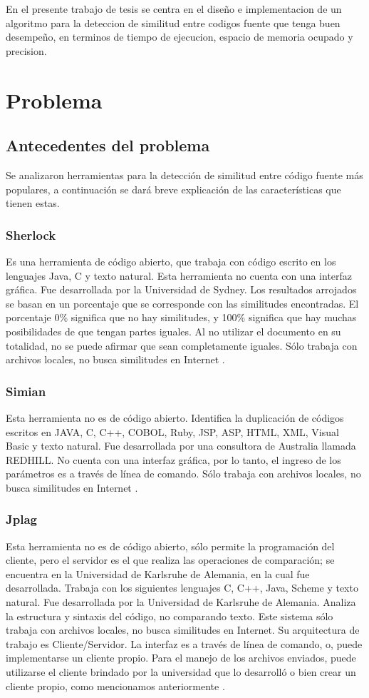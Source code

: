 En el presente trabajo de tesis se centra en el diseño e implementacion de un algoritmo para la deteccion de similitud entre codigos fuente que tenga buen desempeño, en terminos de tiempo de ejecucion, espacio de memoria ocupado y precision.

\section{Problema}
\subsection{Antecedentes del problema}
Se analizaron herramientas para la detección de similitud entre código fuente más populares, a continuación se dará breve explicación de las características que tienen estas.
\subsubsection{Sherlock}
Es una herramienta de código abierto, que trabaja con código escrito en los lenguajes Java, C y texto natural. Esta herramienta no cuenta con una interfaz gráfica. Fue desarrollada por la Universidad de Sydney. Los resultados arrojados se basan en un porcentaje que se corresponde con las similitudes encontradas. El porcentaje 0\% significa que no hay similitudes, y 100\% significa que hay muchas posibilidades de que tengan partes iguales. Al no utilizar el documento en su totalidad, no se puede afirmar que sean completamente iguales. Sólo trabaja con archivos locales, no busca similitudes en Internet \cite{article1}.
\subsubsection{Simian}
Esta herramienta no es de código abierto. Identifica la duplicación de códigos escritos en JAVA, C, C++, COBOL, Ruby, JSP, ASP, HTML, XML, Visual Basic y texto natural. Fue desarrollada por una consultora de Australia llamada REDHILL. No cuenta con una interfaz gráfica, por lo tanto, el ingreso de los parámetros es a través de línea de comando. Sólo trabaja con archivos locales, no busca similitudes en Internet \cite{article1}.
\subsubsection{Jplag}
Esta herramienta no es de código abierto, sólo permite la programación del cliente, pero el servidor es el que realiza las operaciones de comparación; se encuentra en la Universidad de Karlsruhe de Alemania, en la cual fue desarrollada. Trabaja con los siguientes lenguajes C, C++, Java, Scheme y texto natural. Fue desarrollada por la Universidad de Karlsruhe de Alemania. Analiza la estructura y sintaxis del código, no comparando texto. Este sistema sólo trabaja con archivos locales, no busca similitudes en Internet. Su arquitectura de trabajo es Cliente/Servidor. La interfaz es a través de línea de comando, o, puede implementarse un cliente propio. Para el manejo de los archivos enviados, puede utilizarse el cliente brindado por la universidad que lo desarrolló o bien crear un cliente propio, como mencionamos anteriormente \cite{article1}.
